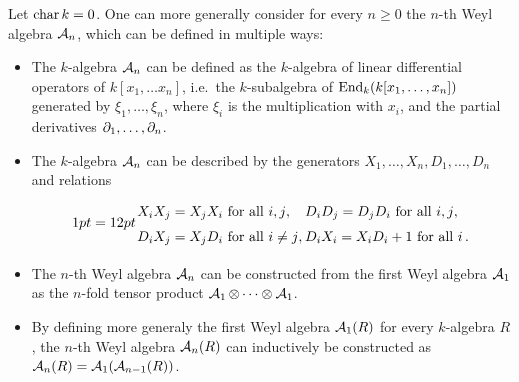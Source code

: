 \begin{remark}
  Let $\operatorname{char} k = 0$.
  One can more generally consider for every $n \geq 0$ the $n$-th Weyl algebra $\operatorname{\mathcal{A}}_n$, which can be defined in multiple ways:
  \begin{itemize}
    \item
      The $k$-algebra $\operatorname{\mathcal{A}}_n$ can be defined as the $k$-algebra of linear differential operators of $k[x_1, \dotsc x_n]$, i.e.\ the $k$-subalgebra of $\operatorname{End}_k(k[x_1, \dotsc, x_n])$ generated by $\xi_1, \dotsc, \xi_n$, where $\xi_i$ is the multiplication with $x_i$, and the partial derivatives $\partial_1, \dotsc, \partial_n$.
    \item
      The $k$-algebra $\operatorname{\mathcal{A}}_n$ can be described by the generators $X_1, \dotsc, X_n, D_1, \dotsc, D_n$ and relations
      \[
        \begingroup
        \arraycolsep = 12pt
        \renewcommand{\arraystretch}{1.5}
        \begin{array}{ll}
            \text{$X_i X_j = X_j X_i$ for all $i,j$},
          & \text{$D_i D_j = D_j D_i$ for all $i, j$},
          \\
            \text{$D_i X_j = X_j D_i$ for all $i \neq j$},
          & \text{$D_i X_i = X_i D_i + 1$ for all $i$} \,.
        \end{array}
        \endgroup
      \]
    \item
      The $n$-th Weyl algebra $\operatorname{\mathcal{A}}_n$ can be constructed from the first Weyl algebra $\operatorname{\mathcal{A}}_1$ as the $n$-fold tensor product $\operatorname{\mathcal{A}}_1 \mathbin{\otimes} \dotsb \mathbin{\otimes} \operatorname{\mathcal{A}}_1$.
    \item
      By defining more generaly the first Weyl algebra $\operatorname{\mathcal{A}}_1(R)$ for every $k$-algebra $R$, the $n$-th Weyl algebra $\operatorname{\mathcal{A}}_n(R)$ can inductively be constructed as $\operatorname{\mathcal{A}}_n(R) = \operatorname{\mathcal{A}}_1(\operatorname{\mathcal{A}}_{n-1}(R))$.
  \end{itemize}
\end{remark}




